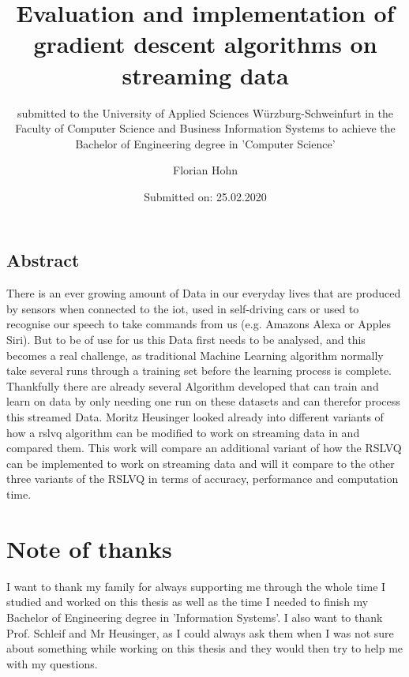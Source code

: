 \documentclass[12pt,oneside,a4paper,parskip]{scrbook}
\def\BaAuthor{Florian Hohn}
\def\BaTitle{Evaluation and implementation of gradient descent algorithms on streaming data}
\def\BaSupervisorOne{Prof.\ Dr.\ Frank-Michael Schleif}
\def\BaSupervisorTwo{Moritz Heusinger}
\def\BaDeadline{25.02.2020}
\begin{document}


\frontmatter
\titlehead{%
  {University of Applied Sciences W\"{u}rzburg-Schweinfurt
  Faculty of Computer Science and Business Information Systems}}
\subject{Bachelor-Thesis}
\title{\BaTitle\\[15mm]}
\subtitle{\normalsize{submitted to the University of Applied Sciences W\"{u}rzburg-Schweinfurt in the Faculty of Computer Science and Business Information Systems to achieve the Bachelor of Engineering degree in 'Computer Science'}}
\author{\BaAuthor}
\date{\normalsize{Submitted on: \BaDeadline}}
\publishers{
  \normalsize{First Reader: \BaSupervisorOne}\\
  \normalsize{Second Reader: \BaSupervisorTwo}\\
}


\maketitle



\section*{Abstract}
There is an ever growing amount of Data in our everyday lives that are produced by sensors when connected to 
the \ac{iot}, used in self-driving cars or used to recognise our speech to take commands from us
(e.g. Amazons Alexa or Apples Siri). But to be of use for us this Data first needs to be analysed, and this 
becomes a real challenge, as traditional Machine Learning algorithm normally take several runs through a training set before 
the learning process is complete.
Thankfully there are already several Algorithm developed that can train and learn on data by only needing one run on 
these datasets and can therefor process this streamed Data.
Moritz Heusinger looked already into different variants of how a \ac{rslvq} algorithm can be modified to work on streaming data
in \cite{PassiveDriftonRSLVQ} and compared them.
This work will compare an additional variant of how the RSLVQ can be implemented to work on streaming data and will it 
compare to the other three variants of the RSLVQ in terms of accuracy, performance and computation time.

\newpage
\chapter*{Note of thanks}
I want to thank my family for always supporting me through the whole time I studied and worked on this thesis as well
as the time I needed to finish my Bachelor of Engineering degree in 'Information Systems'.
I also want to thank Prof. Schleif and Mr Heusinger, as I could always ask them when I was not sure about something while working on 
this thesis and they would then try to help me with my questions.
\end{document}
